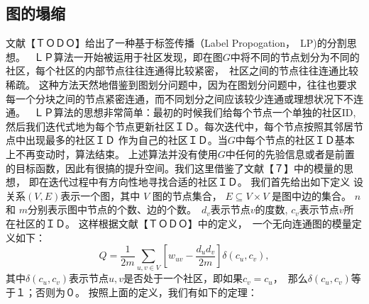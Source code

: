 \documentclass[master]{njuthesis}
\begin{document}
\subsection{图的塌缩}
文献【ＴＯＤＯ】给出了一种基于标签传播（Label Propogation，　LP)的分割思想。　
ＬＰ算法一开始被运用于社区发现，即在图$G$中将不同的节点划分为不同的社区，每个社区的内部节点往往连通得比较紧密，　社区之间的节点往往连通比较稀疏。
这种方法天然地借鉴到图划分问题中，因为在图划分问题中，往往也要求每一个分块之间的节点紧密连通，而不同划分之间应该较少连通或理想状况下不连通。　
ＬＰ算法的思想非常简单：最初的时候我们给每个节点一个单独的社区ID, 然后我们迭代式地为每个节点更新社区ＩＤ。每次迭代中，每个节点按照其邻居节点中出现最多的社区ＩＤ
作为自己的社区ＩＤ。当$G$中每个节点的社区ＩＤ基本上不再变动时，算法结束。
上述算法并没有使用$G$中任何的先验信息或者是前置的目标函数，因此有很搞的提升空间。我们这里借鉴了文献【７】中的模量的思想，
即在迭代过程中有方向性地寻找合适的社区ＩＤ。
我们首先给出如下定义
设关系$(V, E)$表示一个图，其中 $V$ 图的节点集合， $E \subseteq V \times V$ 是图中边的集合。
$n$ 和 $m$分别表示图中节点的个数、边的个数。　$d_v$表示节点$v$的度数, $c_v$表示节点$v$所在社区的ＩＤ。
这样根据文献【ＴＯＤＯ】中的定义，　一个无向连通图的模量定义如下：
\begin{equation}\label{eq:modularity}
Q = \frac{1}{2m}\sum\limits_{u, v \in V} \left[w_{uv} - \frac{{d_u}{d_v}}{2m} \right]\delta(c_u, c_v),
\end{equation}
其中$\delta(c_u, c_v)$表示节点$u, v$是否处于一个社区，即如果$c_v = c_u$，　那么$\delta(c_u, c_v)$等于１；否则为０。
按照上面的定义，我们有如下的定理：
\end{document}
